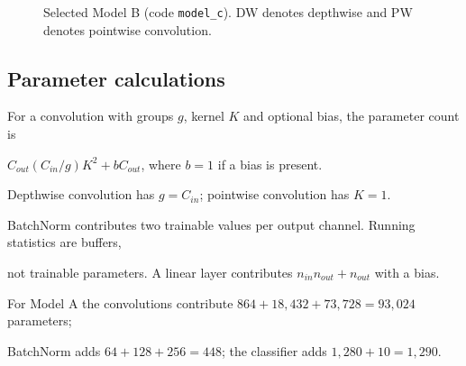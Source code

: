 \documentclass[11pt,a4paper]{article}
\DeclareRobustCommand{\code}[1]{\nolinkurl{#1}}
\begin{document}
\begin{figure}[htbp]\centering

\caption{Selected Model B (code \code{model_c}). DW denotes depthwise and PW denotes pointwise convolution.}\end{figure}



\subsection{Parameter calculations}

For a convolution with groups $g$, kernel $K$ and optional bias, the parameter count is

$C_{out}(C_{in}/g)K^2 + bC_{out}$, where $b=1$ if a bias is present.

Depthwise convolution has $g=C_{in}$; pointwise convolution has $K=1$.

BatchNorm contributes two trainable values per output channel. Running statistics are buffers,

not trainable parameters. A linear layer contributes $n_{in}n_{out}+n_{out}$ with a bias.



For Model A the convolutions contribute $864+18,432+73,728=93,024$ parameters;

BatchNorm adds $64+128+256=448$; the classifier adds $1,280+10=1,290$.
\end{document}

